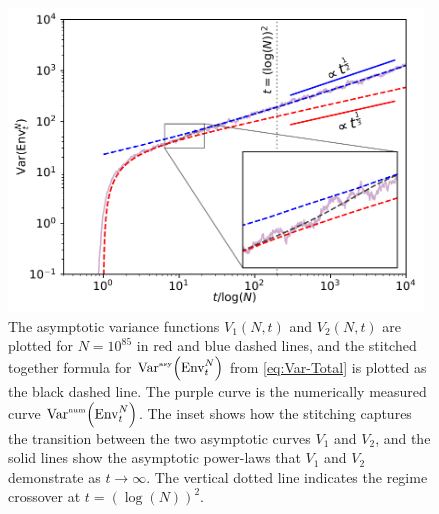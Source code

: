 \documentclass[letter,reqno, 11pt, oneside]{amsart}
\newcommand{\envnt}{\text{Env}_t^N}
\newcommand{\varasy}[1]{\mathrm{Var}^{\textrm{\tiny{asy}}}\!\left(#1\right)}
\newcommand{\varnum}[1]{\mathrm{Var}^{\textrm{\tiny{num}}}\!\left(#1\right)}
\begin{document}
\begin{figure}[h]
 \includegraphics[width=11cm]{Interpolation.pdf}
 \caption{The asymptotic variance functions $V_1(N,t)$ and $V_2(N,t)$ are plotted for $N=10^{85}$ in red and blue dashed lines, and the stitched together formula for $\varasy{\envnt}$ from \eqref{eq:Var-Total} is plotted as the black dashed line. The purple curve is the numerically measured curve  $\varnum{\envnt}$. The inset shows how the stitching captures the transition between the two asymptotic curves $V_1$ and $V_2$, and the solid lines show the asymptotic power-laws that $V_1$ and $V_2$ demonstrate as $t\to\infty$. The vertical dotted line indicates the regime crossover at $t=(\log(N))^2$.}
 \label{fig:Interpolation}
\end{figure}
\end{document}
